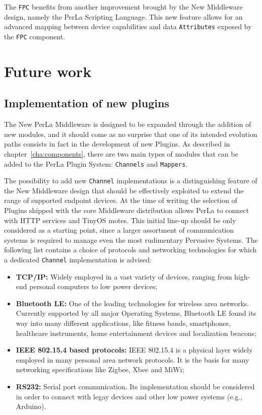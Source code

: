 The \texttt{FPC} benefits from another improvement brought by the New
Middleware design, namely the PerLa Scripting Language. This new feature allows
for an advanced mapping between device capabilities and data
\texttt{Attributes} exposed by the \texttt{FPC} component.


\section{Future work}

\subsection{Implementation of new plugins}

The New PerLa Middleware is designed to be expanded through the addition of new
modules, and it should come as no surprise that one of its intended evolution
paths consists in fact in the development of new Plugins. As described in
chapter~\ref{cha:components}, there are two main types of modules that can be
added to the PerLa Plugin System: \texttt{Channels} and \texttt{Mappers}.

The possibility to add new \texttt{Channel} implementations is a distinguishing
feature of the New Middleware design that should be effectively exploited to
extend the range of supported endpoint devices. At the time of writing the
selection of Plugins shipped with the core Middleware distribution allows PerLa
to connect with HTTP services and TinyOS motes. This initial line-up should be
only considered as a starting point, since a larger assortment of communication
systems is required to manage even the most rudimentary Pervasive Systems. The
following list contains a choice of protocols and networking technologies for
which a dedicated \texttt{Channel} implementation is advised:

\begin{itemize}

    \item \textbf{TCP/IP:} Widely employed in a vast variety of devices,
    ranging from high-end personal computers to low power devices;

    \item \textbf{Bluetooth LE:} One of the leading technologies for wireless
    area networks. Currently supported by all major Operating Systems,
    Bluetooth LE found its way into many different applications, like fitness
    bands, smartphones, healthcare instruments, home entertainment devices and
    localization beacons;

    \item \textbf{IEEE 802.15.4 based protocols:} IEEE 802.15.4 is a physical
    layer widely employed in many personal area network protocols. It is the
    basis for many networking specifications like Zigbee, Xbee and MiWi;

    \item \textbf{RS232:} Serial port communication. Its implementation should
    be considered in order to connect with legay devices and other low power
    systems (e.g., Arduino).

\end{itemize}

